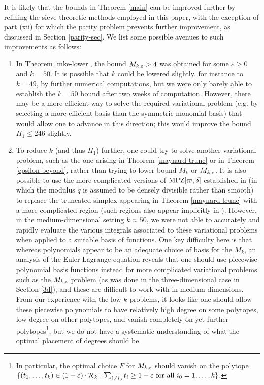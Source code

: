 It is likely that the bounds in Theorem \ref{main} can be improved further by refining the sieve-theoretic methods employed in this paper, with the exception of part (xii) for which the parity problem prevents further improvement, as discussed in Section \ref{parity-sec}.  We list some possible avenues to such improvements as follows:

\begin{enumerate}
\item In Theorem \ref{mke-lower}, the bound $M_{k,\varepsilon} > 4$ was obtained for some $\varepsilon>0$ and $k=50$.  It is possible that $k$ could be lowered slightly, for instance to $k=49$, by further numerical computations, but we were only barely able to establish the $k=50$ bound after two weeks of computation.  However, there may be a more efficient way to solve the required variational problem (e.g. by selecting a more efficient basis than the symmetric monomial basis) that would allow one to advance in this direction; this would improve the bound $H_1 \leq 246$ slightly.
\item To reduce $k$ (and thus $H_1$) further, one could try to solve another variational problem, such as the one arising in Theorem \ref{maynard-trunc} or in Theorem \ref{epsilon-beyond}, rather than trying to lower bound $M_k$ or $M_{k,\varepsilon}$.  It is also possible to use the more complicated versions of $\operatorname*{MPZ}[\varpi,\delta]$ established in \cite{polymath8a} (in which the modulus $q$ is assumed to be densely divisible rather than smooth) to replace the truncated simplex appearing in Theorem \ref{maynard-trunc} with a more complicated region (such regions also appear implicitly in \cite[\S 4.5]{polymath8a}).  However, in the medium-dimensional setting $k \approx 50$, we were not able to accurately and rapidly evaluate the various integrals associated to these variational problems when applied to a suitable basis of functions.  One key difficulty here is that whereas polynomials appear to be an adequate choice of basis for the $M_k$, an analysis of the Euler-Lagrange equation reveals that one should use piecewise polynomial basis functions instead for more complicated variational problems such as the $M_{k,\varepsilon}$ problem (as was done in the three-dimensional case in Section \ref{3d}), and these are difficult to work with in medium dimensions.  From our experience with the low $k$ problems, it looks like one should allow these piecewise polynomials to have relatively high degree on some polytopes, low degree on other polytopes, and vanish completely on yet further polytopes\footnote{In particular, the optimal choice $F$ for $M_{k,\varepsilon}$ should vanish on the polytope $\{ (t_1,\dots,t_k) \in (1+\varepsilon) \cdot {\mathcal R}_k: \sum_{i \neq i_0} t_i \ge 1-\varepsilon \hbox{ for all } i_0=1,\dots,k\}$.}, but we do not have a systematic understanding of what the optimal placement of degrees should be.  

\end{enumerate}
